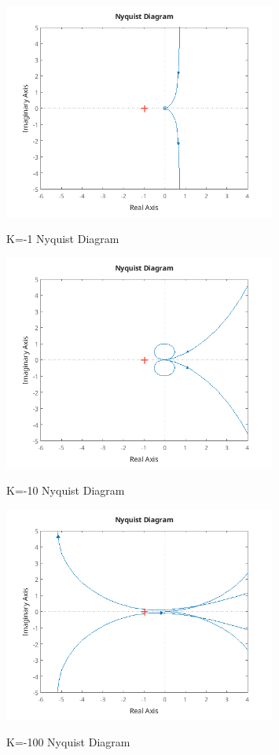 \documentclass{article}
\begin{document}
\begin{figure}[H]
    \centering
    \includegraphics[width=0.8\textwidth]{kNeg1nyquistDiagram.png}
    \label{fig:k-1nyquistDiagram}
    \caption{K=-1 Nyquist Diagram}
\end{figure}

\begin{figure}[H]
    \centering
    \includegraphics[width=0.8\textwidth]{kNeg10nyquistDiagram.png}
    \label{fig:k-10nyquistDiagram}
    \caption{K=-10 Nyquist Diagram}
\end{figure}

\begin{figure}[H]
    \centering
    \includegraphics[width=0.8\textwidth]{kNeg100nyquistDiagram.png}
    \label{fig:k-100nyquistDiagram}
    \caption{K=-100 Nyquist Diagram}
\end{figure}
\end{document}

